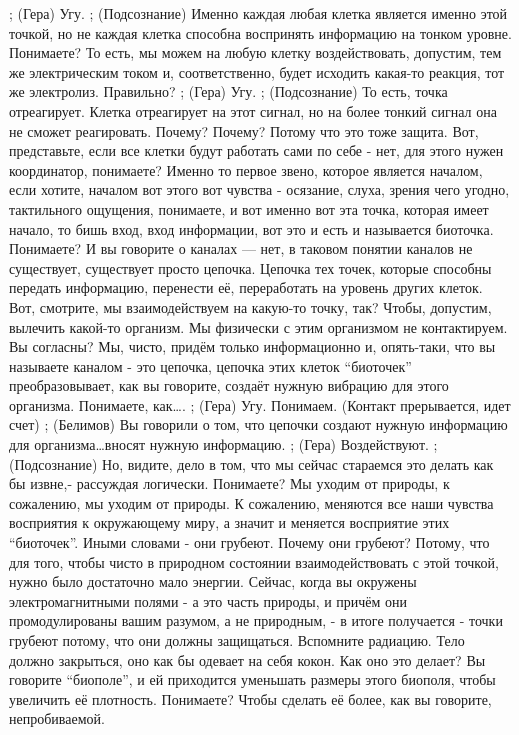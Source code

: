 ;	(Гера) Угу.
;	(Подсознание) Именно каждая любая клетка является именно этой точкой, но не каждая клетка способна воспринять информацию на тонком уровне. Понимаете? То есть, мы можем на любую клетку воздействовать, допустим, тем же электрическим током и, соответственно, будет исходить какая-то реакция, тот же электролиз. Правильно? 
;	(Гера) Угу.
;	(Подсознание) То есть, точка отреагирует. Клетка отреагирует на этот сигнал, но на более тонкий сигнал она не сможет реагировать. Почему? Почему? Потому что это тоже защита. Вот, представьте, если все клетки будут работать сами по себе -  нет, для этого нужен координатор, понимаете? Именно то первое звено, которое является началом, если хотите, началом вот этого вот чувства -  осязание, слуха, зрения чего угодно, тактильного ощущения, понимаете, и вот именно вот эта точка, которая имеет начало, то бишь вход, вход информации, вот это и есть и называется биоточка. Понимаете? И вы говорите о каналах — нет, в таковом понятии каналов не существует, существует просто цепочка. Цепочка тех точек, которые способны передать информацию, перенести её, переработать на уровень других клеток. Вот, смотрите, мы взаимодействуем на какую-то точку, так? Чтобы, допустим, вылечить какой-то организм. Мы физически с этим организмом не контактируем. Вы согласны? Мы, чисто, придём только информационно и, опять-таки, что вы называете каналом - это цепочка, цепочка этих клеток ``биоточек'' преобразовывает, как вы говорите, создаёт нужную вибрацию для этого организма. Понимаете, как….
;	(Гера) Угу. Понимаем.
(Контакт прерывается, идет счет)
;	(Белимов) Вы говорили о том, что цепочки создают нужную информацию для организма…вносят нужную информацию.
;	(Гера) Воздействуют.
;	(Подсознание)  Но, видите, дело в том, что мы сейчас стараемся это делать как бы извне,- рассуждая логически. Понимаете? Мы уходим от природы, к сожалению, мы уходим от природы. К сожалению, меняются все наши чувства восприятия к окружающему миру, а значит и меняется восприятие этих ``биоточек''. Иными словами - они грубеют. Почему они грубеют? Потому, что для того, чтобы чисто в природном состоянии взаимодействовать с этой точкой, нужно было достаточно мало энергии. Сейчас, когда вы окружены электромагнитными полями - а это часть природы, и причём они промодулированы вашим разумом, а не природным, - в итоге получается - точки грубеют потому, что они должны защищаться. Вспомните радиацию. Тело должно закрыться, оно как бы одевает на себя кокон. Как оно это делает? Вы говорите ``биополе'', и ей приходится уменьшать размеры этого биополя, чтобы увеличить её плотность. Понимаете? Чтобы сделать её более, как вы говорите, непробиваемой.
